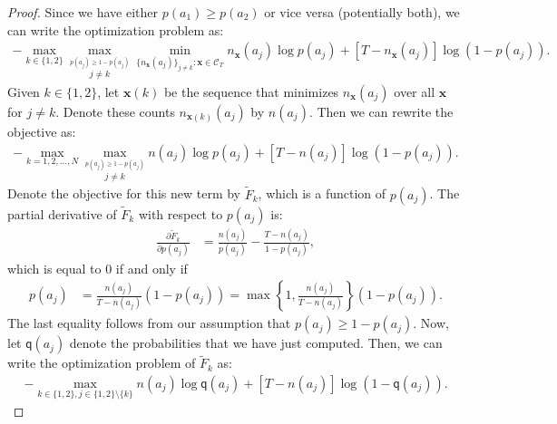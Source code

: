 \documentclass{article}
\newcommand{\sC}{\mathscr C}
\newcommand{\bx}{{\mathbf x}}
\newcommand{\sfq}{{\mathsf q}}
\newcommand{\ignore}[1]{}
\begin{document}
\begin{proof}
  Since we have either $p(a_1) \geq p(a_2)$ or vice versa (potentially both), we can write the optimization problem as:
  \begin{align*}
    -\max_{k \in \{1,2\}} \max_{\stackrel{p(a_j) \geq 1 - p(a_j)}{j\neq k}} \min_{\{n_\bx(a_j)\}_{j\neq k}\colon \bx \in \sC_T}  n_\bx(a_j) \log p(a_j) 
     + \left[T - n_\bx(a_j) \right] \log\left( 1 - p(a_j) \right).
  \end{align*}
  Given $k \in \{1,2\}$, let $\bx(k)$ be the sequence that minimizes $n_\bx(a_j)$ over all $\bx$ for $j \neq k$.
  Denote these counts $n_{\bx(k)}(a_j)$ by $n(a_j)$. Then we can rewrite the objective as:
  \begin{align*}
    -\max_{k=1,2,\ldots, N} \max_{\stackrel{p(a_j) \geq 1 - p(a_j)}{j\neq k}} n(a_j) \log p(a_j) 
     + \left[T - n(a_j) \right] \log\left( 1 - p(a_j) \right).
  \end{align*}
  Denote the objective for this new term by $\tilde{F}_k$, which is a function of $p(a_j)$. The partial derivative of $\tilde{F}_k$ with respect to $p(a_j)$ is:
  \begin{align*}
    \frac{\partial \tilde{F}_k}{\partial p(a_j)}
    & = \frac{n(a_j)}{p(a_j)} - \frac{T - n(a_j)}{1 - p(a_j)}, 
  \end{align*}
  which is equal to $0$ if and only if 
  \begin{align*}
    p(a_j) 
    & = \frac{n(a_j)}{T - n(a_j)} \left( 1 - p(a_j) \right) 
    = \max\left\{1, \frac{n(a_j)}{T - n(a_j)}\right\} \left( 1 - p(a_j) \right). 
  \end{align*}
  The last equality follows from our assumption that $p(a_j) \geq 1 - p(a_j)$. Now, let $\sfq(a_j)$ denote the probabilities that we have just computed. 
  Then, we can write the optimization problem of $\tilde{F}_k$ as:
  \begin{align*}
    -\max_{k \in \{1,2\}, j \in \{1,2\} \setminus \{k\}} n(a_j) \log \sfq(a_j) 
    + \left[T - n(a_j) \right] \log\left( 1 - \sfq(a_j) \right).
  \end{align*}
\end{proof}
\ignore{
Theorem~\ref{th:inftyrd1gram} shows that the solutions of the
$\infty$-R\'enyi divergence optimization are based on the $n$-gram
counts of sequences in $\sC_T$ with ``high entropy''. This can be
very different from the maximum likelihood solutions, which are based
on the average $n$-gram counts.  For instance, suppose we are under
the assumptions of Theorem~\ref{th:inftyrd1gram}, and specifically,
assume that there are $T$ sequences in $\sC_T$. Assume that one of
the sequences has $\left(\frac{1}{2} + \gamma\right)T$ occurrences of
$a_1$ for some small $\gamma > 0$ and that the other $T-1$ sequences
have $T-1$ occurrences of $a_1$. Then,
$n(a_1) = \left(\frac{1}{2} + \gamma\right)T$, and the solution
of the $\infty$-R\'enyi divergence optimization problem is given by
$\sfq_\infty(a_1) = \frac{1 + 2\gamma}{2}$ and
$\sfq_\infty(a_2) = \frac{1 - 2\gamma}{2}$. On the other hand,
the maximum-likelihood solution would be
$\sfq_1(a_1) = 1 + \frac{\gamma}{T} - \frac{3}{2T} + \frac{1}{T^2} \approx 1$
and $\sfq_1(a_2) = \frac{3}{2T} - \frac{\gamma}{T} - \frac{1}{T^2} \approx 0$
for large $T$.
}
\end{document}
